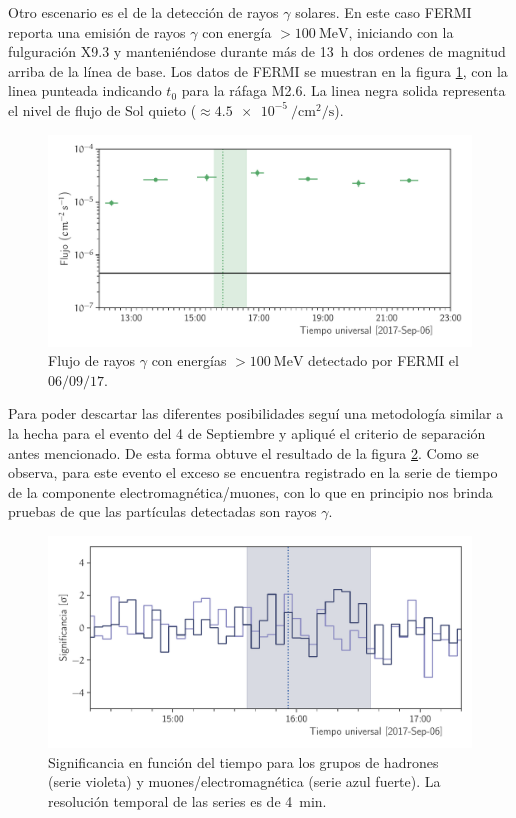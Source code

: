 Otro escenario es el de la detección de rayos $\gamma$ solares. En este caso FERMI reporta una emisión de rayos $\gamma$ con energía $>\SI{100}{\mega\electronvolt}$, iniciando con la fulguración X\num{9.3} y manteniéndose durante más de \SI{13}{\hour} dos ordenes de magnitud arriba de la línea de base. Los datos de FERMI se muestran en la figura \ref{fig:september-06-gammas}, con la linea punteada indicando $t_{0}$ para la ráfaga M\num{2.6}. La linea negra solida representa el nivel de flujo de Sol quieto ($\approx\SI{4.5e-5}{\per\square\cm\per\second}$).

\begin{figure}
        \centering
        \includegraphics[width=\textwidth]{gammas-170906.pdf}
        \caption{Flujo de rayos $\gamma$ con energías $>\SI{100}{\mega\electronvolt}$ detectado por FERMI el $06/09/17$.}
        \label{fig:september-06-gammas}
\end{figure}

Para poder descartar las diferentes posibilidades seguí una metodología similar a la hecha para el evento del \num{4} de Septiembre y apliqué el criterio de separación antes mencionado. De esta forma obtuve el resultado de la figura \ref{fig:september-06-disc}. Como se observa, para este evento el exceso se encuentra registrado en la serie de tiempo de la componente electromagnética/muones, con lo que en principio nos brinda pruebas de que las partículas detectadas son rayos $\gamma$.

\begin{figure}
        \centering
        \includegraphics[width=\textwidth]{significance-170906.pdf}
        \caption{Significancia en función del tiempo para los grupos de hadrones (serie violeta) y muones/electromagnética (serie azul fuerte). La resolución temporal de las series es de \SI{4}{\minute}.}
        \label{fig:september-06-disc}
\end{figure}


